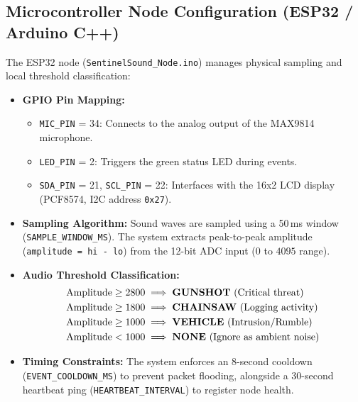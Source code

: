 \documentclass[11pt,a4paper]{article}
\begin{document}
\subsection{Microcontroller Node Configuration (ESP32 / Arduino C++)}
The ESP32 node (\texttt{SentinelSound\_Node.ino}) manages physical sampling and local threshold classification:
\begin{itemize}
    \item \textbf{GPIO Pin Mapping:}
        \begin{itemize}
            \item \texttt{MIC\_PIN} = 34: Connects to the analog output of the MAX9814 microphone.
            \item \texttt{LED\_PIN} = 2: Triggers the green status LED during events.
            \item \texttt{SDA\_PIN} = 21, \texttt{SCL\_PIN} = 22: Interfaces with the 16x2 LCD display (PCF8574, I2C address \texttt{0x27}).
        \end{itemize}
    \item \textbf{Sampling Algorithm:} Sound waves are sampled using a 50\,ms window (\texttt{SAMPLE\_WINDOW\_MS}). The system extracts peak-to-peak amplitude (\texttt{amplitude = hi - lo}) from the 12-bit ADC input ($0$ to $4095$ range).
    \item \textbf{Audio Threshold Classification:}
        \begin{align*}
            \text{Amplitude} &\ge 2800 \implies \text{\textbf{GUNSHOT} (Critical threat)} \\
            \text{Amplitude} &\ge 1800 \implies \text{\textbf{CHAINSAW} (Logging activity)} \\
            \text{Amplitude} &\ge 1000 \implies \text{\textbf{VEHICLE} (Intrusion/Rumble)} \\
            \text{Amplitude} &< 1000 \implies \text{\textbf{NONE} (Ignore as ambient noise)}
        \end{align*}
    \item \textbf{Timing Constraints:} The system enforces an 8-second cooldown (\texttt{EVENT\_COOLDOWN\_MS}) to prevent packet flooding, alongside a 30-second heartbeat ping (\texttt{HEARTBEAT\_INTERVAL}) to register node health.
\end{itemize}
\end{document}
